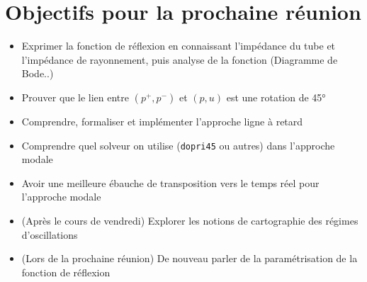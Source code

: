 \documentclass[a4paper, 11pt]{article}
\begin{document}
\section{Objectifs pour la prochaine réunion}
\begin{itemize}
	\item Exprimer la fonction de réflexion en connaissant l'impédance du tube et l'impédance de rayonnement, puis analyse de la fonction (Diagramme de Bode..)
	\item Prouver que le lien entre $(p^{+}, p^{-})$ et $(p,u)$ est une rotation de 45°
	\item Comprendre, formaliser et implémenter l'approche ligne à retard
	\item Comprendre quel solveur on utilise (\texttt{dopri45} ou autres) dans l'approche modale
	\item Avoir une meilleure ébauche de transposition vers le temps réel pour l'approche modale		
	\item (Après le cours de vendredi) Explorer les notions de cartographie des régimes d'oscillations 
	\item (Lors de la prochaine réunion) De nouveau parler de la paramétrisation de la fonction de réflexion
\end{itemize}
\end{document}

